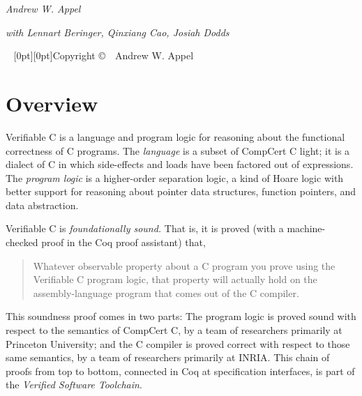 \documentclass[12pt,fleqn,openany,oneside,showtrims]{memoir}
\newcommand\vstversion{2.11}
\begin{document}
\frontmatter
{}
\thispagestyle{empty}%
{
\centering
  \vspace*{4pc}%
  \fontsize{48}{48}\selectfont\par{}%

\vskip50pt
  \fontsize{20}{30}\selectfont\par{}%

\vskip50pt
  \fontsize{14}{16}\selectfont\par\noindent{\itshape Version \vstversion{} \\ \today}
\vskip100pt
\par
\vskip10pt
{\fontsize{24}{30}\selectfont\par\noindent%
{\itshape Andrew W. Appel}}\par
\vskip10pt
{\fontsize{16}{19}\selectfont\par\noindent%
{\centering \itshape with Lennart Beringer, Qinxiang Cao, Josiah Dodds \\}}
}

~\vfill
\setlength{\parindent}{0pt}
\setlength{\parskip}{\baselineskip}
\clearpage
\raisebox{-7in}[0pt][0pt]{Copyright \copyright\ \the\year\ Andrew W. Appel}

\tableofcontents  %

\clearpage
\savepagenumber
\mainmatter
\restorepagenumber
\renewcommand{\chaptermark}[1]{\markboth{\thechapter.~#1\hfill{%
\thefile}\hspace*{2em}}{}}

\chapter{Overview}
Verifiable C is a language and program logic for reasoning about the
functional correctness of C programs.  The \emph{language} is
a subset of CompCert C light; it is a dialect of C in which
side-effects and loads have been factored out of expressions.
The \emph{program logic} is a higher-order separation logic,
a kind of Hoare logic with better support for reasoning about
pointer data structures, function pointers, and data abstraction.

Verifiable C is \emph{foundationally sound.}  That is,
it is proved (with a machine-checked proof in the Coq proof assistant)
that,
\begin{quote}
  Whatever observable property about a C program you prove using the
  Verifiable C program logic, that property will actually hold on the
  assembly-language program that comes out of the C compiler.
\end{quote}
This soundness proof comes in two parts: The program logic
is proved sound with respect to the semantics of CompCert C,
by a team of researchers primarily at Princeton University;
and the C compiler is proved correct with respect to those same
semantics, by a team of researchers primarily at INRIA.
This chain of proofs from top to
bottom, connected in Coq at specification interfaces,
is part of the \emph{Verified Software Toolchain}.
\end{document}
